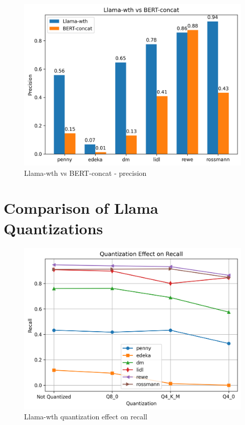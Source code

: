 \documentclass[licencjacka,en]{pracamgr}
\begin{document}
\begin{appendices}
\begin{figure}[h]
    \centering
    \includegraphics[width=0.8\linewidth]{bachelor_images/benchmark/llama_vs_bert_precision.png}
    \caption{Llama-wth vs BERT-concat - precision}
    \label{fig:llama_vs_bert_precision}
\end{figure}

\chapter{Comparison of Llama Quantizations} \label{AppG}
\begin{figure}[h]
    \centering
    \includegraphics[width=0.8\linewidth]{bachelor_images/quant_comp/quantization_effect_on_recall.png}
    \caption{Llama-wth quantization effect on recall}
    \label{fig:quantization_effect_on_recall}
\end{figure}


\end{appendices}
\end{document}
